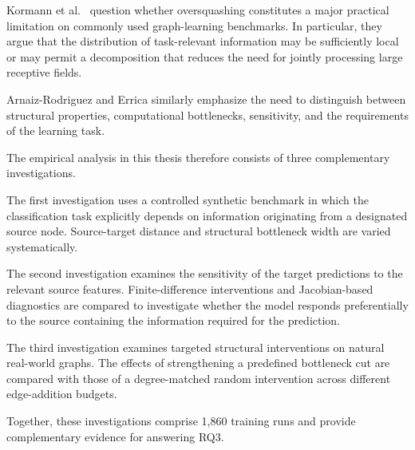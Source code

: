 \documentclass[english]{lni}
\begin{document}
Kormann et al.\ \cite{kormann2026position} question whether
oversquashing constitutes a major practical limitation on
commonly used graph-learning benchmarks. In particular,
they argue that the distribution of task-relevant information
may be sufficiently local or may permit a decomposition
that reduces the need for jointly processing large receptive
fields.

Arnaiz-Rodriguez and Errica
\cite{arnaiz2026demystifying} similarly emphasize the need
to distinguish between structural properties, computational
bottlenecks, sensitivity, and the requirements of the
learning task.

The empirical analysis in this thesis therefore consists
of three complementary investigations.

The first investigation uses a controlled synthetic
benchmark in which the classification task explicitly
depends on information originating from a designated
source node. Source-target distance and structural
bottleneck width are varied systematically.

The second investigation examines the sensitivity of the
target predictions to the relevant source features.
Finite-difference interventions and Jacobian-based
diagnostics are compared to investigate whether the model
responds preferentially to the source containing the
information required for the prediction.

The third investigation examines targeted structural
interventions on natural real-world graphs. The effects
of strengthening a predefined bottleneck cut are compared
with those of a degree-matched random intervention across
different edge-addition budgets.

Together, these investigations comprise 1,860 training
runs and provide complementary evidence for answering RQ3.


\clearpage


\end{document}

